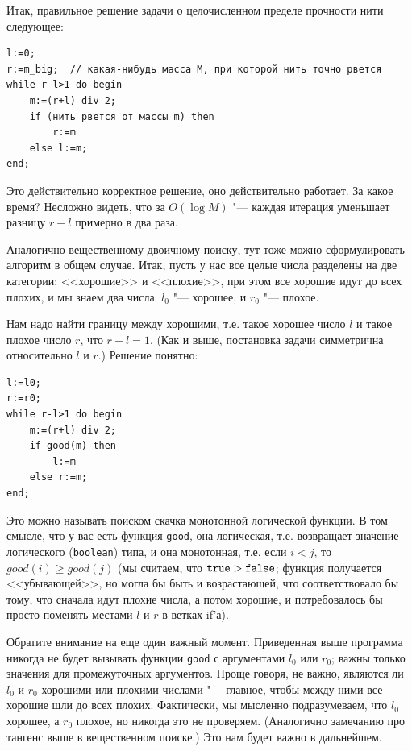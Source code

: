 \documentclass[a4paper,10pt]{problems}
\begin{document}
Итак, правильное решение задачи о целочисленном пределе прочности нити следующее:
\begin{codesampleo}\begin{verbatim}
l:=0;
r:=m_big;  // какая-нибудь масса M, при которой нить точно рвется
while r-l>1 do begin    
    m:=(r+l) div 2;
    if (нить рвется от массы m) then
        r:=m
    else l:=m;
end;
\end{verbatim}
\end{codesampleo}

Это действительно корректное решение, оно действительно работает. За какое время? 
Несложно видеть, что за $O(\log M)$ "--- каждая итерация уменьшает разницу $r-l$ примерно в два раза.

 Аналогично вещественному двоичному поиску, тут тоже можно сформулировать алгоритм в общем случае.
Итак, пусть у нас все целые числа разделены на две категории: <<хорошие>> и <<плохие>>, при этом все хорошие идут до всех плохих,
и мы знаем два числа: $l_0$ "--- хорошее, и $r_0$ "--- плохое. 

Нам надо найти границу между хорошими, т.е. такое хорошее число $l$ и такое плохое число $r$, что $r-l=1$. 
(Как и выше, постановка задачи симметрична относительно $l$ и $r$.)
Решение понятно:
\begin{codesampleo}\begin{verbatim}
l:=l0;
r:=r0;  
while r-l>1 do begin    
    m:=(r+l) div 2;
    if good(m) then
        l:=m
    else r:=m;
end;
\end{verbatim}
\end{codesampleo}

Это можно называть поиском скачка монотонной логической функции. 
В том смысле, что у вас есть функция \verb`good`, она логическая, 
т.е. возвращает значение логического (\verb`boolean`) типа,
и она монотонная, т.е. если $i<j$, то $good(i)\geq good(j)$ 
(мы считаем, что $\verb`true`>\verb`false`$; функция получается <<убывающей>>,
но могла бы быть и возрастающей, что соответствовало бы тому,
что сначала идут плохие числа, а потом хорошие, и потребовалось бы просто поменять местами $l$ и $r$
в ветках if'а). 

Обратите внимание на еще один важный момент. 
Приведенная выше программа никогда не будет вызывать функции \verb`good`
с аргументами $l_0$ или $r_0$; важны только значения для промежуточных аргументов.
Проще говоря, не важно, являются ли $l_0$ и $r_0$ хорошими или плохими числами
"--- главное, чтобы между ними все хорошие шли до всех плохих. 
Фактически, мы мысленно подразумеваем, что $l_0$ хорошее, а $r_0$ плохое, но
никогда это не проверяем.
(Аналогично замечанию про тангенс выше в вещественном поиске.)
Это нам будет важно в дальнейшем.
\end{document}
